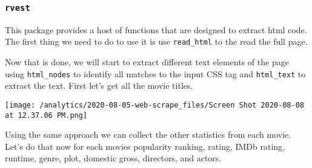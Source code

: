 \documentclass[]{article}
\newenvironment{Shaded}{\begin{snugshade}}{\end{snugshade}}
\newcommand{\KeywordTok}[1]{\textcolor[rgb]{0.13,0.29,0.53}{\textbf{#1}}}
\newcommand{\NormalTok}[1]{#1}
\newcommand{\OperatorTok}[1]{\textcolor[rgb]{0.81,0.36,0.00}{\textbf{#1}}}
\newcommand{\StringTok}[1]{\textcolor[rgb]{0.31,0.60,0.02}{#1}}
\begin{document}
\hypertarget{rvest}{%
\subsubsection{\texorpdfstring{\texttt{rvest}}{rvest}}\label{rvest}}

This package provides a host of functions that are designed to extract
html code. The first thing we need to do to use it is use
\texttt{read\_html} to the read the full page.

\begin{Shaded}
\end{Shaded}

Now that is done, we will start to extract different text elements of
the page using \texttt{html\_nodes} to identify all matches to the input
CSS tag and \texttt{html\_text} to extract the text. First let's get all
the movie titles.

\texttt{[image: /analytics/2020-08-05-web-scrape\_files/Screen Shot 2020-08-08 at 12.37.06 PM.png]}

\begin{Shaded}
\end{Shaded}

Using the same approach we can collect the other statistics from each
movie. Let's do that now for each movies popularity ranking, rating,
IMDb rating, runtime, genre, plot, domestic gross, directors, and
actors.

\begin{Shaded}
\end{Shaded}
\end{document}
